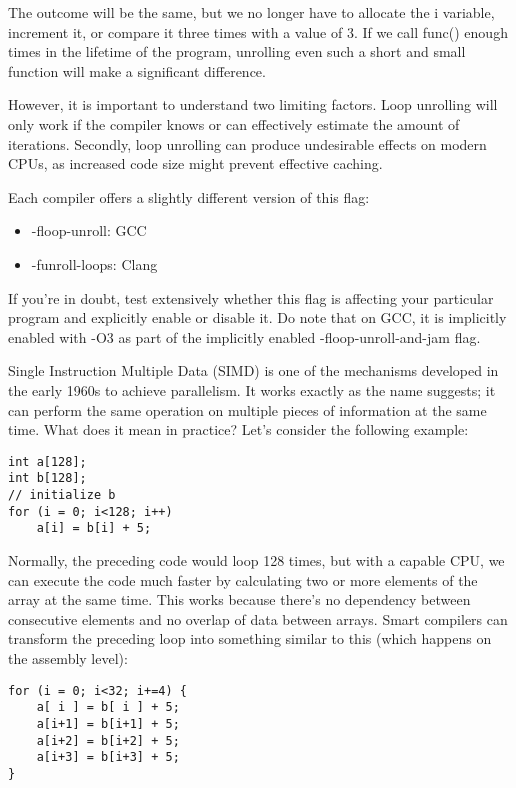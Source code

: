 The outcome will be the same, but we no longer have to allocate the i variable, increment it, or compare it three times with a value of 3. If we call func() enough times in the lifetime of the program, unrolling even such a short and small function will make a significant difference.

However, it is important to understand two limiting factors. Loop unrolling will only work if the compiler knows or can effectively estimate the amount of iterations. Secondly, loop unrolling can produce undesirable effects on modern CPUs, as increased code size might prevent effective caching.

Each compiler offers a slightly different version of this flag:

\begin{itemize}
\item 
-floop-unroll: GCC

\item 
-funroll-loops: Clang
\end{itemize}

If you're in doubt, test extensively whether this flag is affecting your particular program and explicitly enable or disable it. Do note that on GCC, it is implicitly enabled with -O3 as part of the implicitly enabled -floop-unroll-and-jam flag.


Single Instruction Multiple Data (SIMD) is one of the mechanisms developed in the early 1960s to achieve parallelism. It works exactly as the name suggests; it can perform the same operation on multiple pieces of information at the same time. What does it mean in practice? Let's consider the following example:

\begin{lstlisting}[style=styleCXX]
int a[128];
int b[128];
// initialize b
for (i = 0; i<128; i++)
	a[i] = b[i] + 5;
\end{lstlisting}

Normally, the preceding code would loop 128 times, but with a capable CPU, we can execute the code much faster by calculating two or more elements of the array at the same time. This works because there's no dependency between consecutive elements and no overlap of data between arrays. Smart compilers can transform the preceding loop into something similar to this (which happens on the assembly level):

\begin{lstlisting}[style=styleCXX]
for (i = 0; i<32; i+=4) {
	a[ i ] = b[ i ] + 5;
	a[i+1] = b[i+1] + 5;
	a[i+2] = b[i+2] + 5;
	a[i+3] = b[i+3] + 5;
}
\end{lstlisting}

